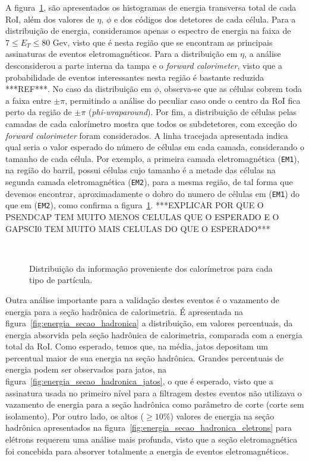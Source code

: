A figura~\ref{fig:estatistica_inicial}, são apresentados os histogramas de energia transversa total de cada RoI, além dos valores de $\eta$, $\phi$ e dos códigos dos detetores de cada célula. Para a distribuição de energia, consideramos apenas o espectro de energia na faixa de $7 \le E_T \le 80$ Gev, visto que é nesta região que se encontram as principais assinaturas de eventos eletromagnéticos. Para a distribuição em $\eta$, a análise desconsiderou a parte interna da tampa e o \emph{forward calorimeter}, visto que a probabilidade de eventos interessantes nesta região é bastante reduzida ***REF***.  No caso da distribuição em $\phi$, observa-se que  as células cobrem toda a faixa entre $\pm \pi$, permitindo a análise do peculiar caso onde o centro da RoI fica perto da região de $\pm \pi$ (\emph{phi-wraparound}). Por fim, a distribuição de células pelas camadas de cada calorímetro mostra que todos os subdetetores, com exceção do \emph{forward calorimeter} foram considerados. A linha tracejada apresentada indica qual seria o valor esperado do número de células em cada camada, considerando o tamanho de cada célula. Por exemplo, a primeira camada eletromagnética (\texttt{EM1}), na região do barril,  possui células cujo tamanho é a metade das células na segunda camada eletromagnética (\texttt{EM2}), para a mesma região, de tal forma que devemos encontrar, aproximadamente o dobro do numero de células em (\texttt{EM1}) do que em (\texttt{EM2}), como confirma a figura~\ref{fig:estatistica_inicial}. ***EXPLICAR POR QUE O PSENDCAP TEM MUITO MENOS CELULAS QUE O ESPERADO E O GAPSCI0 TEM MUITO MAIS CELULAS DO QUE O ESPERADO***

\begin{figure}
\centering 
{} \\
\caption{Distribuição da informação proveniente dos calorímetros para cada tipo de partícula.} 
\label{fig:estatistica_inicial} 
\end{figure} 


Outra análise importante para a validação destes eventos é o vazamento de energia para a seção hadrônica de calorimetria. É apresentada na figura~\ref{fig:energia_secao_hadronica} a distribuição, em valores percentuais, da energia absorvida pela seção hadrônica de calorimetria, comparada com a energia total da RoI. Como esperado, temos que, na média, jatos depositam um percentual maior de sua energia na seção hadrônica. Grandes percentuais de energia podem ser observados para jatos, na figura~\ref{fig:energia_secao_hadronica_jatos}, o que é esperado, visto que a assinatura usada no  primeiro nível para a filtragem destes eventos não utilizava o vazamento de energia para a seção hadrônica como parâmetro de corte (corte sem isolamento). Por outro lado,  os altos ($\ge 10\%$) valores de energia na seção hadrônica apresentados na figura~\ref{fig:energia_secao_hadronica_eletrons} para elétrons requerem uma análise mais profunda, visto que a seção eletromagnética foi concebida para absorver totalmente a energia de eventos eletromagnéticos. 

